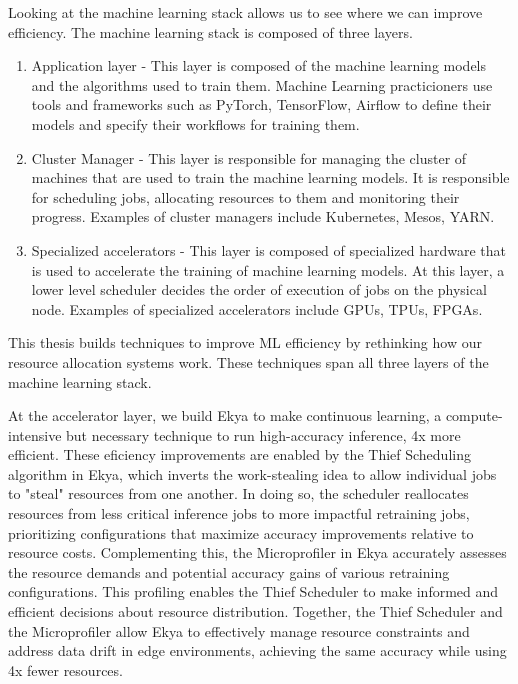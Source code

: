 Looking at the machine learning stack allows us to see where we can improve efficiency. The machine learning stack is composed of three layers.

\begin{enumerate}
    \item Application layer - This layer is composed of the machine learning models and the algorithms used to train them. Machine Learning practicioners use tools and frameworks such as PyTorch, TensorFlow, Airflow to define their models and specify their workflows for training them.
    \item Cluster Manager - This layer is responsible for managing the cluster of machines that are used to train the machine learning models. It is responsible for scheduling jobs, allocating resources to them and monitoring their progress. Examples of cluster managers include Kubernetes, Mesos, YARN.
    \item Specialized accelerators - This layer is composed of specialized hardware that is used to accelerate the training of machine learning models. At this layer, a lower level scheduler decides the order of execution of jobs on the physical node. Examples of specialized accelerators include GPUs, TPUs, FPGAs.
\end{enumerate}

This thesis builds techniques to improve ML efficiency by rethinking how our resource allocation systems work. These techniques span all three layers of the machine learning stack.

At the accelerator layer, we build Ekya to make continuous learning, a compute-intensive but necessary technique to run high-accuracy inference, 4x more efficient. These eficiency improvements are enabled by the Thief Scheduling algorithm in Ekya, which inverts the work-stealing idea \cite{something} to allow individual jobs to "steal" resources from one another. In doing so, the scheduler reallocates resources from less critical inference jobs to more impactful retraining jobs, prioritizing configurations that maximize accuracy improvements relative to resource costs. Complementing this, the Microprofiler in Ekya accurately assesses the resource demands and potential accuracy gains of various retraining configurations. This profiling enables the Thief Scheduler to make informed and efficient decisions about resource distribution. Together, the Thief Scheduler and the Microprofiler allow Ekya to effectively manage resource constraints and address data drift in edge environments, achieving the same accuracy while using 4x fewer resources.


